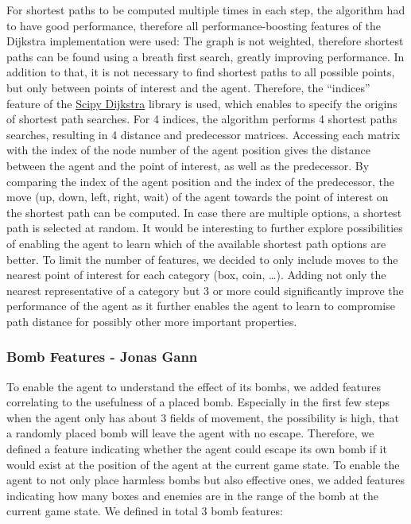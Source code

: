 \documentclass{article}
\begin{document}
For shortest paths to be computed multiple times in each step, the algorithm had to have good performance, therefore all performance-boosting features of the Dijkstra implementation were used: The graph is not weighted, therefore shortest paths can be found using a breath first search, greatly improving performance. In addition to that, it is not necessary to find shortest paths to all possible points, but only between points of interest and the agent. Therefore, the “indices” feature of the \href{https://docs.scipy.org/doc/scipy/reference/generated/scipy.sparse.csgraph.dijkstra.html}{Scipy Dijkstra} library is used, which enables to specify the origins of shortest path searches. For 4 indices, the algorithm performs 4 shortest paths searches, resulting in 4 distance and predecessor matrices. Accessing each matrix with the index of the node number of the agent position gives the distance between the agent and the point of interest, as well as the predecessor. By comparing the index of the agent position and the index of the predecessor, the move (up, down, left, right, wait) of the agent towards the point of interest on the shortest path can be computed. In case there are multiple options, a shortest path is selected at random. It would be interesting to further explore possibilities of enabling the agent to learn which of the available shortest path options are better.
To limit the number of features, we decided to only include moves to the nearest point of interest for each category (box, coin, …). Adding not only the nearest representative of a category but 3 or more could significantly improve the performance of the agent as it further enables the agent to learn to compromise path distance for possibly other more important properties.

\subsubsection[Bomb Features]{Bomb Features {\small - Jonas Gann}}

To enable the agent to understand the effect of its bombs, we added features correlating to the usefulness of a placed bomb. Especially in the first few steps when the agent only has about 3 fields of movement, the possibility is high, that a randomly placed bomb will leave the agent with no escape. Therefore, we defined a feature indicating  whether the agent could escape its own bomb if it would exist at the position of the agent at the current game state. To enable the agent to not only place harmless bombs but also effective ones, we added features indicating how many boxes and enemies are in the range of the bomb at the current game state. We defined in total 3 bomb features:
\end{document}
